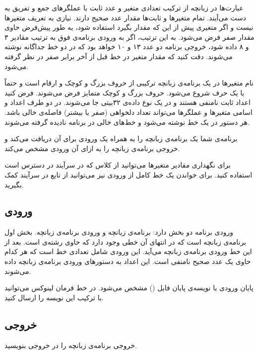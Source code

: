 \documentclass{utap}
\begin{document}
    عبارت‌ها در زبانچه از ترکیب تعدادی متغیر و عدد ثابت با عملگرهای جمع و تفریق به دست می‌آیند. تمام متغیرها و ثابت‌ها مقدار عدد صحیح دارند. نیازی به تعریف متغیرها نیست و اگر متغیری پیش از این که مقدار بگیرد استفاده شود، به طور پیش‌فرض حاوی مقدار صفر فرض می‌شود. به این ترتیب، اگر به ورودی برنامه‌ی فوق به ترتیب مقادیر ۳ و ۸ داده شود، خروجی برنامه دو عدد ۱۳ و ۱۰ خواهد بود که در دو خط جداگانه نوشته می‌شوند. دقت کنید که مقدار متغیر  در خط قبل از آخر برابر صفر در نظر گرفته می‌شود.

    نام متغیرها در یک برنامه‌ی زبانچه ترکیبی از حروف بزرگ و کوچک و ارقام است و حتماً با یک حرف شروع می‌شود. حروف بزرگ و کوچک متمایز فرض می‌شوند. فرض کنید اعداد ثابت نامنفی هستند و در یک نوع داده‌ی ۳۲‌بیتی جا می‌شوند. در دو طرف اعداد و اسامی متغیرها و عملگرها می‌تواند تعداد دلخواهی (صفر یا بیشتر) فاصله‌ی خالی باشد. هر دستور در یک خط نوشته می‌شود و خط‌های خالی در برنامه نادیده گرفته می‌شوند.

    برنامه‌ی شما یک برنامه‌ی زبانچه را به همراه یک ورودی برای آن دریافت می‌کند و خروجی برنامه‌ی زبانچه را به ازای آن ورودی مشخص می‌کند.

    برای نگهداری مقادیر متغیرها می‌توانید از کلاس  که در سرآیند  در دسترس است استفاده کنید.
    برای خواندن یک خط کامل از ورودی نیز می‌توانید از تابع  در سرآیند  کمک بگیرید.

    \subsection{ورودی}

    ورودی برنامه دو بخش دارد: برنامه‌ی زبانچه و ورودی برنامه‌ی زبانچه.    
    بخش اول برنامه‌ی زبانچه است که در انتهای آن خطی وجود دارد که حاوی رشته‌ی  است.
    بعد از این خط ورودی برنامه‌ی زبانچه می‌آید. این ورودی شامل تعدادی خط است که هر کدام حاوی یک عدد صحیح نامنفی است. این اعداد به دستورهای ورودی برنامه‌ی زبانچه داده می‌شوند.
    
    پایان ورودی با نویسه‌ی پایان فایل () مشخص می‌شود. در خط فرمان لینوکس می‌توانید با ترکیب  این نویسه را ارسال کنید.

    \subsection{خروجی}
    
    خروجی برنامه‌ی زبانچه را در خروجی بنویسید.
\end{document}
